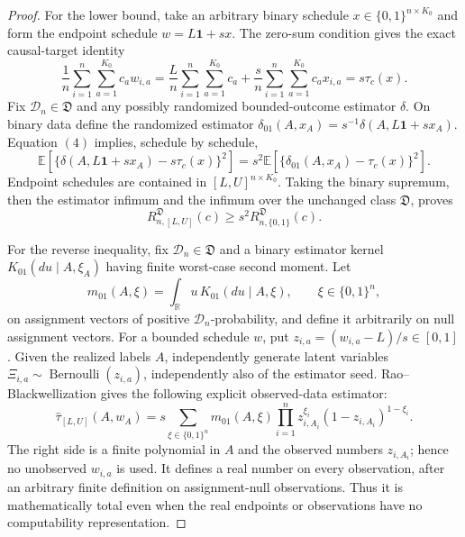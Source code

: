 \documentclass{article}
\begin{document}
{\begin{proof}
For the lower bound, take an arbitrary binary schedule \(x\in\{0,1\}^{n\times K_0}\) and form the endpoint schedule \(w=L\mathbf 1+sx\).  The zero-sum condition gives the exact causal-target identity
\[
 \frac1n\sum_{i=1}^n\sum_{a=1}^{K_0}c_aw_{i,a}
 =\frac{L}{n}\sum_{i=1}^n\sum_{a=1}^{K_0}c_a
  +\frac{s}{n}\sum_{i=1}^n\sum_{a=1}^{K_0}c_ax_{i,a}
 =s\tau_c(x).
\tag{4}
\]
Fix \(\mathcal D_n\in\mathfrak D\) and any possibly randomized bounded-outcome estimator \(\delta\).  On binary data define the randomized estimator
\(
\delta_{01}(A,x_A)=s^{-1}\delta(A,L\mathbf1+sx_A)
\).
Equation \((4)\) implies, schedule by schedule,
\[
 \mathbb E\!\left[
 \{\delta(A,L\mathbf1+sx_A)-s\tau_c(x)\}^2\right]
 =s^2\mathbb E\!\left[
 \{\delta_{01}(A,x_A)-\tau_c(x)\}^2\right].
\]
Endpoint schedules are contained in \([L,U]^{n\times K_0}\).  Taking the binary supremum, then the estimator infimum and the infimum over the unchanged class \(\mathfrak D\), proves
\[
 R^{\mathfrak D}_{n,[L,U]}(c)
 \ge s^2R^{\mathfrak D}_{n,\{0,1\}}(c).
\]

For the reverse inequality, fix \(\mathcal D_n\in\mathfrak D\) and a binary estimator kernel \(K_{01}(du\mid A,\xi_A)\) having finite worst-case second moment.  Let
\[
 m_{01}(A,\xi)=\int_{\mathbb R}u\,
 K_{01}(du\mid A,\xi),
 \qquad \xi\in\{0,1\}^n,
\]
on assignment vectors of positive \(\mathcal D_n\)-probability, and define it arbitrarily on null assignment vectors.  For a bounded schedule \(w\), put \(z_{i,a}=(w_{i,a}-L)/s\in[0,1]\).  Given the realized labels \(A\), independently generate latent variables \(\Xi_{i,a}\sim\operatorname{Bernoulli}(z_{i,a})\), independently also of the estimator seed.  Rao--Blackwellization gives the following explicit observed-data estimator:
\[
 \widehat\tau_{[L,U]}(A,w_A)
 =s\sum_{\xi\in\{0,1\}^n}m_{01}(A,\xi)
   \prod_{i=1}^n
   z_{i,A_i}^{\xi_i}(1-z_{i,A_i})^{1-\xi_i}.
\tag{5}
\]
The right side is a finite polynomial in \(A\) and the observed numbers \(z_{i,A_i}\); hence no unobserved \(w_{i,a}\) is used.  It defines a real number on every observation, after an arbitrary finite definition on assignment-null observations.  Thus it is mathematically total even when the real endpoints or observations have no computability representation.


\end{proof}}
\end{document}
